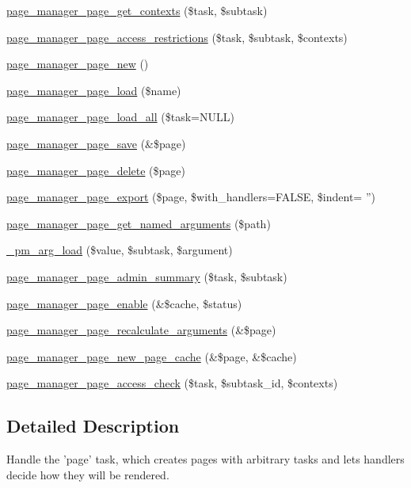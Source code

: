 \begin{DoxyCompactItemize}
\item 
\hyperlink{page_8inc_ad43b368472766e6f474e64ab84f7574e}{page\_\-manager\_\-page\_\-get\_\-contexts} (\$task, \$subtask)
\item 
\hyperlink{page_8inc_aaf41766d0992f11cde5f0614fa8562dc}{page\_\-manager\_\-page\_\-access\_\-restrictions} (\$task, \$subtask, \$contexts)
\item 
\hyperlink{page_8inc_a4ac24df17e8abb4b1abf5b7f8363711a}{page\_\-manager\_\-page\_\-new} ()
\item 
\hyperlink{page_8inc_aa18e88f2c523d008c125fef1de5f8ae6}{page\_\-manager\_\-page\_\-load} (\$name)
\item 
\hyperlink{page_8inc_a972b54bd49c7bff37077b15f7e38e0fa}{page\_\-manager\_\-page\_\-load\_\-all} (\$task=NULL)
\item 
\hyperlink{page_8inc_a2201f36620dbaa3f8a3a44b69870c91c}{page\_\-manager\_\-page\_\-save} (\&\$page)
\item 
\hyperlink{page_8inc_a342ab9e4d389d4aa534e26b69ee9e887}{page\_\-manager\_\-page\_\-delete} (\$page)
\item 
\hyperlink{page_8inc_a9ca4e20fa8f4be7150f0e5b4e78695a3}{page\_\-manager\_\-page\_\-export} (\$page, \$with\_\-handlers=FALSE, \$indent= '')
\item 
\hyperlink{page_8inc_a395da60a40abbe79e2a0a92eab2becb9}{page\_\-manager\_\-page\_\-get\_\-named\_\-arguments} (\$path)
\item 
\hyperlink{page_8inc_aac7c9639394ed3bc6d64db4b2e752465}{\_\-pm\_\-arg\_\-load} (\$value, \$subtask, \$argument)
\item 
\hyperlink{page_8inc_a023d4d8c65b426589a2532abc1c12f05}{page\_\-manager\_\-page\_\-admin\_\-summary} (\$task, \$subtask)
\item 
\hyperlink{page_8inc_ac1d2df5fdb136328eeec44b074c0b46e}{page\_\-manager\_\-page\_\-enable} (\&\$cache, \$status)
\item 
\hyperlink{page_8inc_aeb93001c1f88906988ee43110212c4f5}{page\_\-manager\_\-page\_\-recalculate\_\-arguments} (\&\$page)
\item 
\hyperlink{page_8inc_a0e1ae5b02b5976676123d40fa3a3dabd}{page\_\-manager\_\-page\_\-new\_\-page\_\-cache} (\&\$page, \&\$cache)
\item 
\hyperlink{page_8inc_a151ef88a466094b0056f0250dc22552b}{page\_\-manager\_\-page\_\-access\_\-check} (\$task, \$subtask\_\-id, \$contexts)
\end{DoxyCompactItemize}


\subsection{Detailed Description}
Handle the 'page' task, which creates pages with arbitrary tasks and lets handlers decide how they will be rendered.

